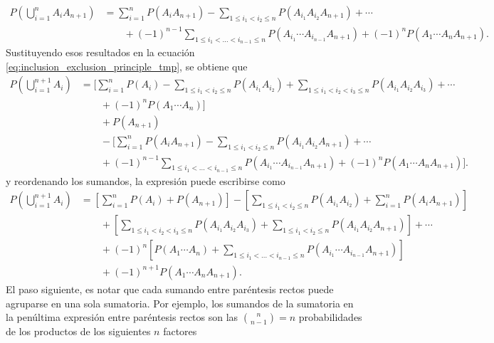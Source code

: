 \documentclass[a4paper]{report}
\begin{document}
\begin{enumerate}
\begingroup
\addtolength{\jot}{1em}
\begin{equation*}
 \begin{aligned}
 P\left(\bigcup_{i=1}^{n}A_{i}A_{n+1}\right)&=\sum_{i=1}^nP(A_iA_{n+1})-\sum_{1\leq i_1 < i_2\leq n}P(A_{i_1}A_{i_2}A_{n+1})+\cdots\\
   &\qquad+(-1)^{n-1}\sum_{1\leq i_1 <\dots< i_{n-1}\leq n}P(A_{i_1}\cdots A_{i_{n-1}}A_{n+1})+(-1)^nP(A_1\cdots A_nA_{n+1}).
\end{aligned}
\end{equation*}
\endgroup 
Sustituyendo esos resultados en la ecuación \ref{eq:inclusion_exclusion_principle_tmp}, se obtiene que
\begingroup
\addtolength{\jot}{1em}
\begin{equation*}
 \begin{aligned}
 P\left(\bigcup_{i=1}^{n+1}A_{i}\right)&=\Bigg[\sum_{i=1}^nP(A_i)-\sum_{1\leq i_1 < i_2\leq n}P(A_{i_1}A_{i_2})+\sum_{1\leq i_1 < i_2 < i_3\leq n}P(A_{i_1}A_{i_2}A_{i_3})+\cdots\\
   &\qquad+(-1)^nP(A_1\cdots A_n)\Bigg]\\
   &\qquad+ P(A_{n+1})\\
   &\qquad-\Bigg[\sum_{i=1}^nP(A_iA_{n+1})-\sum_{1\leq i_1 < i_2\leq n}P(A_{i_1}A_{i_2}A_{n+1})+\cdots\\
   &\qquad+(-1)^{n-1}\sum_{1\leq i_1 <\dots< i_{n-1}\leq n}P(A_{i_1}\cdots A_{i_{n-1}}A_{n+1})+(-1)^nP(A_1\cdots A_nA_{n+1})\Bigg].
\end{aligned}
\end{equation*}
\endgroup 
y reordenando los sumandos, la expresión puede escribirse como
\begingroup
\addtolength{\jot}{1em}
\begin{equation}\label{eq:inclusion_exclusion_principle_tmp1}
 \begin{aligned}
 P\left(\bigcup_{i=1}^{n+1}A_{i}\right)&=\left[\sum_{i=1}^nP(A_i)+ P(A_{n+1})\right]
 -\left[\sum_{1\leq i_1 < i_2\leq n}P(A_{i_1}A_{i_2})+\sum_{i=1}^nP(A_iA_{n+1})\right]\\
   &\qquad+\left[\sum_{1\leq i_1 < i_2 < i_3\leq n}P(A_{i_1}A_{i_2}A_{i_3})+\sum_{1\leq i_1 < i_2\leq n}P(A_{i_1}A_{i_2}A_{n+1})\right]+\cdots\\
   &\qquad+(-1)^n\left[P(A_1\cdots A_n)+\sum_{1\leq i_1 <\dots< i_{n-1}\leq n}P(A_{i_1}\cdots A_{i_{n-1}}A_{n+1})\right]\\
   &\qquad +(-1)^{n+1}P(A_1\cdots A_nA_{n+1}).
\end{aligned}
\end{equation}
\endgroup 
El paso siguiente, es notar que cada sumando entre paréntesis rectos puede agruparse en una sola sumatoria. Por ejemplo, los sumandos de la sumatoria en la penúltima expresión entre paréntesis rectos son las \(\binom{n}{n-1}=n\) probabilidades de los productos de los siguientes \(n\) factores

\end{enumerate}
\end{document}
